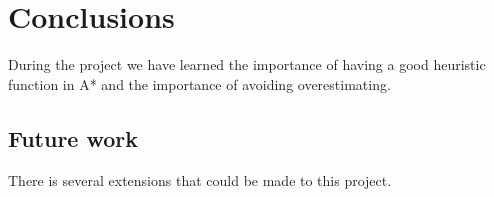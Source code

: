 \chapter{Conclusions}
During the project we have learned the importance of having a good heuristic function in A* and the importance of avoiding overestimating. 

\section{Future work}
There is several extensions that could be made to this project. 
